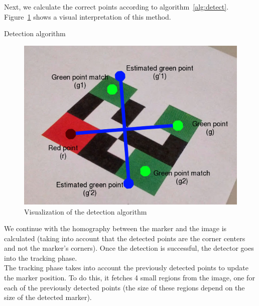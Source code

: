 \documentclass[DIV=calc, paper=a4, fontsize=11pt, twocolumn]{scrartcl}   %
\begin{document}
Next, we calculate the correct points according to algorithm~\ref{alg:detect}. Figure~\ref{fig:detect} shows a visual
interpretation of this method.

\begin{algorithm}
\caption{Detection algorithm}
\label{alg:detect}
\end{algorithm}

\begin{figure}[!h]
    \centering
    \includegraphics[width=0.9\columnwidth]{marker.png}
    \caption{Visualization of the detection algorithm}
    \label{fig:detect}
\end{figure}

We continue with the homography between the marker and the image is calculated (taking into account that the detected points are the corner centers and not the marker's corners).
Once the detection is successful, the detector goes into the tracking phase.\\


The tracking phase takes into account the previously detected points to update the marker position. To do this, it fetches 4 small regions from the image, one for each of the previously detected points (the size of these regions depend on the size of the detected marker).\\
\end{document}
